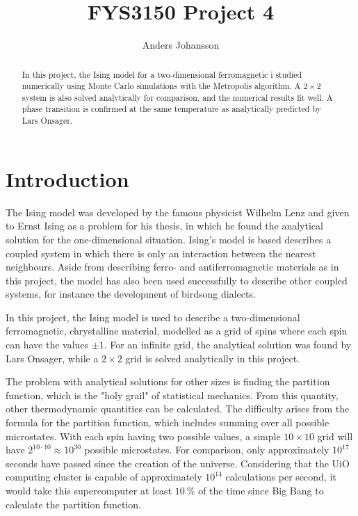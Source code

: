 \documentclass[12pt,english,a4paper]{article}
\title{FYS3150 Project 4}
\author{Anders Johansson}
\begin{document}
%
\maketitle
\pagestyle{fancy}
\tableofcontents

\begin{abstract}
In this project, the Ising model for a two-dimensional ferromagnetic i studied numerically using Monte Carlo simulations with the Metropolis algorithm. A \(2\times2\) system is also solved analytically for comparison, and the numerical results fit well. A phase transition is confirmed at the same temperature as analytically predicted by Lars Onsager.
\end{abstract}
\clearpage


\section{Introduction}
The Ising model was developed by the famous physicist Wilhelm Lenz and given to Ernst Ising as a problem for his thesis, in which he found the analytical solution for the one-dimensional situation. Ising's model is based describes a coupled system in which there is only an interaction between the nearest neighbours. Aside from describing ferro- and antiferromagnetic materials as in this project, the model has also been used successfully to describe other coupled systems, for instance the development of birdsong dialects\autocite{birdsong}.

In this project, the Ising model is used to describe a two-dimensional ferromagnetic, chrystalline material, modelled as a grid of spins where each spin can have the values \(\pm1\). For an infinite grid, the analytical solution was found by Lars Onsager, while a \(2\times2\) grid is solved analytically in this project.

The problem with analytical solutions for other sizes is finding the partition function, which is the "holy grail" of statistical mechanics. From this quantity, other thermodynamic quantities can be calculated. The difficulty arises from the formula for the partition function, which includes summing over all possible microstates. With each spin having two possible values, a simple \(10\times10\) grid will have \(2^{10\cdot10}\approx10^{30}\) possible microstates. For comparison, only approximately \(10^{17}\) seconds have passed since the creation of the universe. Considering that the UiO computing cluster is capable of approximately \(10^{14}\) calculations per second, it would take this supercomputer at least \(\SI{10}{\percent}\) of the time since Big Bang to calculate the partition function.
\end{document}
